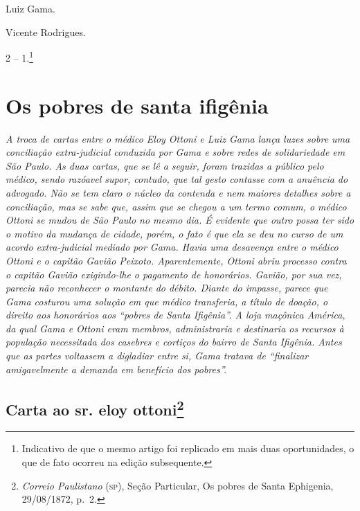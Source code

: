 Luiz Gama.

Vicente Rodrigues.

2 -- 1.\footnote{ Indicativo de que o mesmo artigo foi replicado em
  mais duas oportunidades, o que de fato ocorreu na edição subsequente.}

\part{Os pobres de santa ifigênia}

\begin{argumento}
\emph{A troca de cartas entre o médico Eloy Ottoni e Luiz Gama lança
luzes sobre uma conciliação extra-judicial conduzida por Gama e sobre
redes de solidariedade em São Paulo. As duas cartas, que se lê a seguir,
foram trazidas a público pelo médico, sendo razóavel supor, contudo, que
tal gesto contasse com a anuência do advogado. Não se tem claro o núcleo
da contenda e nem maiores detalhes sobre a conciliação, mas se sabe que,
assim que se chegou a um termo comum, o médico Ottoni se mudou de São
Paulo no mesmo dia. É evidente que outro possa ter sido o motivo da
mudança de cidade, porém, o fato é que ela se deu no curso de um acordo
extra-judicial mediado por Gama. Havia uma desavença entre o médico
Ottoni e o capitão Gavião Peixoto. Aparentemente, Ottoni abriu processo
contra o capitão Gavião exigindo-lhe o pagamento de honorários. Gavião,
por sua vez, parecia não reconhecer o montante do débito. Diante do
impasse, parece que Gama costurou uma solução em que médico transferia,
a título de doação, o direito aos honorários aos ``pobres de Santa
Ifigênia''. A loja maçônica América, da qual Gama e Ottoni eram membros,
administraria e destinaria os recursos à população necessitada dos
casebres e cortiços do bairro de Santa Ifigênia. Antes que as partes
voltassem a digladiar entre si, Gama tratava de ``finalizar amigavelmente
a demanda em benefício dos pobres''.}
\end{argumento}

\chapter{Carta ao sr. eloy ottoni\footnote{\emph{Correio Paulistano} (\textsc{sp}), Seção Particular, Os
  pobres de Santa Ephigenia, 29/08/1872, p.~2.}} %

